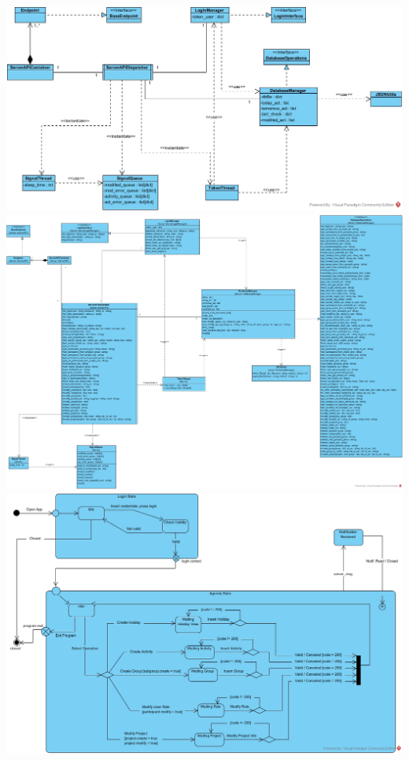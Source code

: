 \documentclass[12pt]{scrartcl}
\begin{document}
\includegraphics[angle=90,origin=c,scale=0.6]{ManageIT_Server_DomainClassDiagram.jpg}\\
\includegraphics[angle=90,origin=c,scale=0.37]{ManageIT_Server_ImplementedClassDiagram.jpg}
\includegraphics[angle=90,origin=c,scale=0.6]{ManageIT_StateChart_Client.jpg}
\end{document}
